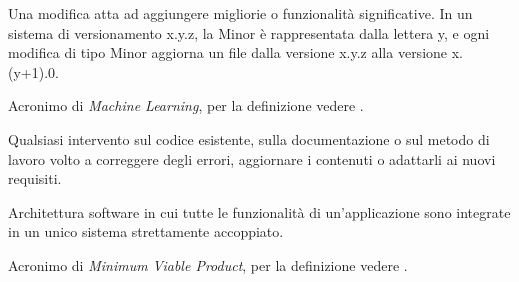 Una modifica atta ad aggiungere migliorie o funzionalità significative. In un sistema di versionamento x.y.z, la Minor è rappresentata dalla lettera y, e ogni modifica di tipo Minor aggiorna un file dalla versione x.y.z alla versione x.(y+1).0.

Acronimo di \textit{Machine Learning}, per la definizione vedere .

Qualsiasi intervento sul codice esistente, sulla documentazione o sul metodo di lavoro volto a correggere degli errori, aggiornare i contenuti o adattarli ai nuovi requisiti.

Architettura software in cui tutte le funzionalità di un’applicazione sono integrate in un unico sistema strettamente accoppiato.

Acronimo di \textit{Minimum Viable Product}, per la definizione vedere .

